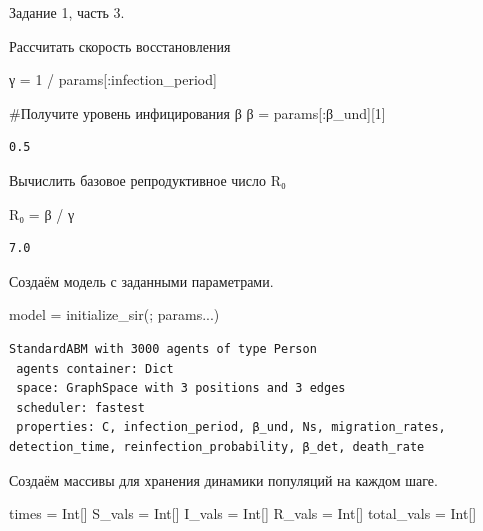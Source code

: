 \documentclass[
  12pt,
  a4paper,
  DIV=11,
  numbers=noendperiod]{scrreprt}
\newenvironment{Shaded}{\begin{snugshade}}{\end{snugshade}}
\newcommand{\CommentTok}[1]{\textcolor[rgb]{0.37,0.37,0.37}{#1}}
\newcommand{\DataTypeTok}[1]{\textcolor[rgb]{0.68,0.00,0.00}{#1}}
\newcommand{\FloatTok}[1]{\textcolor[rgb]{0.68,0.00,0.00}{#1}}
\newcommand{\FunctionTok}[1]{\textcolor[rgb]{0.28,0.35,0.67}{#1}}
\newcommand{\NormalTok}[1]{\textcolor[rgb]{0.00,0.23,0.31}{#1}}
\newcommand{\OperatorTok}[1]{\textcolor[rgb]{0.37,0.37,0.37}{#1}}
\begin{document}
Задание 1, часть 3.

Рассчитать скорость восстановления

\begin{Shaded}
\begin{Highlighting}[]
\NormalTok{γ }\OperatorTok{=} \FloatTok{1} \OperatorTok{/}\NormalTok{ params[}\OperatorTok{:}\NormalTok{infection\_period]}

\CommentTok{\#Получите уровень инфицирования β}
\NormalTok{β }\OperatorTok{=}\NormalTok{ params[}\OperatorTok{:}\NormalTok{β\_und][}\FloatTok{1}\NormalTok{]}
\end{Highlighting}
\end{Shaded}

\begin{verbatim}
0.5
\end{verbatim}

Вычислить базовое репродуктивное число R₀

\begin{Shaded}
\begin{Highlighting}[]
\NormalTok{R₀ }\OperatorTok{=}\NormalTok{ β }\OperatorTok{/}\NormalTok{ γ}
\end{Highlighting}
\end{Shaded}

\begin{verbatim}
7.0
\end{verbatim}

Создаём модель с заданными параметрами.

\begin{Shaded}
\begin{Highlighting}[]
\NormalTok{model }\OperatorTok{=} \FunctionTok{initialize\_sir}\NormalTok{(; params}\OperatorTok{...}\NormalTok{)}
\end{Highlighting}
\end{Shaded}

\begin{verbatim}
StandardABM with 3000 agents of type Person
 agents container: Dict
 space: GraphSpace with 3 positions and 3 edges
 scheduler: fastest
 properties: C, infection_period, β_und, Ns, migration_rates, detection_time, reinfection_probability, β_det, death_rate
\end{verbatim}

Создаём массивы для хранения динамики популяций на каждом шаге.

\begin{Shaded}
\begin{Highlighting}[]
\NormalTok{times }\OperatorTok{=} \DataTypeTok{Int}\NormalTok{[]}
\NormalTok{S\_vals }\OperatorTok{=} \DataTypeTok{Int}\NormalTok{[]}
\NormalTok{I\_vals }\OperatorTok{=} \DataTypeTok{Int}\NormalTok{[]}
\NormalTok{R\_vals }\OperatorTok{=} \DataTypeTok{Int}\NormalTok{[]}
\NormalTok{total\_vals }\OperatorTok{=} \DataTypeTok{Int}\NormalTok{[]}
\end{Highlighting}
\end{Shaded}
\end{document}
